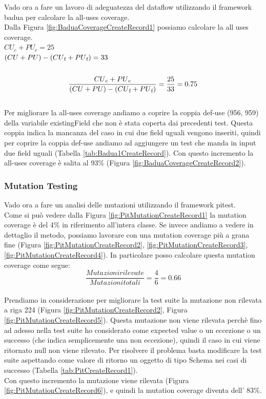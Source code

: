 \documentclass[10pt, a4paper]{article}
\begin{document}
Vado ora a fare un lavoro di adeguatezza del dataflow utilizzando il framework badua per calcolare la all-uses coverage. \\
Dalla Figura \ref{fig:BaduaCoverageCreateRecord1} possiamo calcolare la all uses coverage. \\
\(CU_c + PU_c = 25\) \\
\( (CU + PU) - (CU\textsubscript{f} + PU\textsubscript{f}) = 33\) \\ \\
\[\frac{{CU\textsubscript{c} + PU\textsubscript{c}}}{{(CU + PU) - (CU\textsubscript{f} + PU\textsubscript{f})}} = \frac{{25}}{{33}} = 0.75\] \\ 
Per migliorare la all-uses coverage andiamo a coprire la coppia def-use (956, 959) della variabile existingField che non 
è stata coperta dai precedenti test. Questa coppia indica la mancanza del caso in cui due field uguali vengono inseriti, 
quindi per coprire la coppia def-use andiamo ad aggiungere un test che manda in input due field uguali 
(Tabella \ref{tab:Badua1CreateRecord}).
Con questo incremento la all-uses coverage è salita al 93\% (Figura \ref{fig:BaduaCoverageCreateRecord2}).
\subsubsection{Mutation Testing}

Vado ora a fare un analisi delle mutazioni utilizzando il framework pitest. \\
Come si può vedere dalla Figura \ref{fig:PitMutationCreateRecord1} la mutation coverage è del 4\% in riferimento 
all'intera classe. Se invece andiamo a vedere in dettaglio il metodo, possiamo lavorare con una mutation coverage 
più a grana fine (Figura \ref{fig:PitMutationCreateRecord2}, \ref{fig:PitMutationCreateRecord3}, \ref{fig:PitMutationCreateRecord4}).
In particolare posso calcolare questa mutation coverage come segue:
\[\frac{{Mutazioni rilevate}}{{Mutazioni totali}} = \frac{{4}}{{6}} = 0.66\] \\
Prendiamo in considerazione per migliorare la test suite la mutazione non rilevata a riga 224 
(Figura \ref{fig:PitMutationCreateRecord2}, Figura \ref{fig:PitMutationCreateRecord5}).
Questa mutazione non viene rilevata perchè fino ad adesso nella test suite ho considerato come expected value o un eccezione
o un successo (che indica semplicemente una non eccezione), quindi il caso in cui viene ritornato null non viene rilevato.
Per risolvere il problema basta modificare la test suite aspettando come valore di ritorno un oggetto di tipo Schema nei casi 
di successo (Tabella \ref{tab:PitCreateRecord1}). \\
Con questo incremento la mutazione viene rilevata (Figura \ref{fig:PitMutationCreateRecord6}), e quindi 
la mutation coverage diventa dell' 83\%. 
\end{document}
